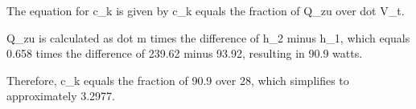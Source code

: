The equation for c_k is given by c_k equals the fraction of Q_zu over dot V_t. 

Q_zu is calculated as dot m times the difference of h_2 minus h_1, which equals 0.658 times the difference of 239.62 minus 93.92, resulting in 90.9 watts.

Therefore, c_k equals the fraction of 90.9 over 28, which simplifies to approximately 3.2977.